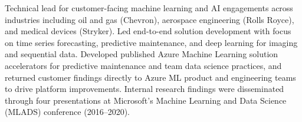 \documentclass[letterpaper,11pt]{nih}
\begin{document}
Technical lead for customer-facing machine learning and AI engagements across industries including oil and gas (Chevron), aerospace engineering (Rolls Royce), and medical devices (Stryker). Led end-to-end solution development with focus on time series forecasting, predictive maintenance, and deep learning for imaging and sequential data. Developed published Azure Machine Learning solution accelerators for predictive maintenance and team data science practices, and returned customer findings directly to Azure ML product and engineering teams to drive platform improvements. Internal research findings were disseminated through four presentations at Microsoft's Machine Learning and Data Science (MLADS) conference (2016--2020).\\
% 
% 
% 
% 
% 
\end{document}
